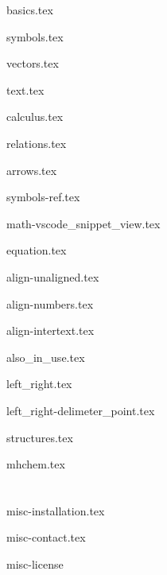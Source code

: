 \documentclass[allauthors]{../../cursuspresentatie}
\def\importslide#1#2{%
	{#2}
}
\begin{document}

\importslide{math}{basics.tex}

\importslide{math}{symbols.tex}

\importslide{math}{vectors.tex}
\importslide{math}{text.tex}
\importslide{math}{calculus.tex}


\importslide{math}{relations.tex}
\importslide{math}{arrows.tex}
\importslide{math}{symbols-ref.tex}

\importslide{math}{math-vscode_snippet_view.tex}

\importslide{math}{equation.tex}


\importslide{math}{align-unaligned.tex}
\importslide{math}{align-numbers.tex}
\importslide{math}{align-intertext.tex}

\importslide{math}{also_in_use.tex}

\importslide{math}{left_right.tex}
\importslide{math}{left_right-delimeter_point.tex}

\importslide{math}{structures.tex}

\importslide{math}{mhchem.tex}










\section{\texorpdfstring{}{Good to know}}

\importslide{misc}{misc-installation.tex}



\importslide{misc}{misc-contact.tex}

\importslide{misc}{misc-license}
	
\end{document}
